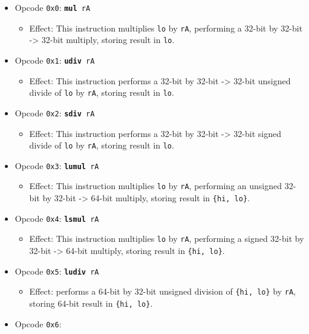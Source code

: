 \documentclass{article}
\begin{document}
	\singlespacing
	\begin{itemize}
		\item Opcode \texttt{0x0}:
			\texttt{\textbf{mul} rA}
		\begin{itemize}
			\item Effect:  This instruction multiplies \texttt{lo} by
			\texttt{rA}, performing a 32-bit by 32-bit -> 32-bit multiply,
			storing result in \texttt{lo}.
		\end{itemize}
		\item Opcode \texttt{0x1}:
			\texttt{\textbf{udiv} rA}
		\begin{itemize}
			\item Effect:  This instruction performs a 32-bit by 32-bit ->
			32-bit unsigned divide of \texttt{lo} by \texttt{rA}, storing
			result in \texttt{lo}.
		\end{itemize}
		\item Opcode \texttt{0x2}:
			\texttt{\textbf{sdiv} rA}
		\begin{itemize}
			\item Effect:  This instruction performs a 32-bit by 32-bit ->
			32-bit signed divide of \texttt{lo} by \texttt{rA}, storing
			result in \texttt{lo}.
		\end{itemize}
		\item Opcode \texttt{0x3}:
			\texttt{\textbf{lumul} rA}
		\begin{itemize}
			\item Effect:  This instruction multiplies \texttt{lo} by
			\texttt{rA}, performing an unsigned 32-bit by 32-bit -> 64-bit
			multiply, storing result in \texttt{\{hi, lo\}}.
		\end{itemize}
		\item Opcode \texttt{0x4}:
			\texttt{\textbf{lsmul} rA}
		\begin{itemize}
			\item Effect:  This instruction multiplies \texttt{lo} by
			\texttt{rA}, performing a signed 32-bit by 32-bit -> 64-bit
			multiply, storing result in \texttt{\{hi, lo\}}.
		\end{itemize}
		\item Opcode \texttt{0x5}:
			\texttt{\textbf{ludiv} rA}
		\begin{itemize}
			\item Effect:  performs a 64-bit by 32-bit unsigned division of
			\texttt{\{hi, lo\}} by \texttt{rA}, storing 64-bit result in
			\texttt{\{hi, lo\}}.
		\end{itemize}
		\item Opcode \texttt{0x6}:

\end{itemize}
\end{document}
